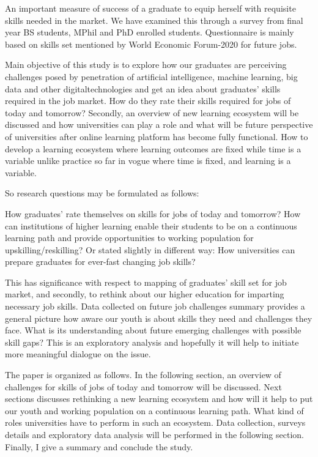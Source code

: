 \documentclass[
  12pt]{article}
\begin{document}
An important measure of success of a graduate to equip herself with
requisite skills needed in the market. We have examined this through a
survey from final year BS students, MPhil and PhD enrolled students.
Questionnaire is mainly based on skills set mentioned by World Economic
Forum-2020 for future jobs.

Main objective of this study is to explore how our graduates are
perceiving challenges posed by penetration of artificial intelligence,
machine learning, big data and other digitaltechnologies and get an idea
about graduates' skills required in the job market. How do they rate
their skills required for jobs of today and tomorrow? Secondly, an
overview of new learning ecosystem will be discussed and how
universities can play a role and what will be future perspective of
universities after online learning platform has become fully functional.
How to develop a learning ecosystem where learning outcomes are fixed
while time is a variable unlike practice so far in vogue where time is
fixed, and learning is a variable.

So research questions may be formulated as follows:

How graduates' rate themselves on skills for jobs of today and tomorrow?
How can institutions of higher learning enable their students to be on a
continuous learning path and provide opportunities to working population
for upskilling/reskilling? Or stated slightly in different way: How
universities can prepare graduates for ever-fast changing job skills?

This has significance with respect to mapping of graduates' skill set
for job market, and secondly, to rethink about our higher education for
imparting necessary job skills. Data collected on future job challenges
summary provides a general picture how aware our youth is about skills
they need and challenges they face. What is its understanding about
future emerging challenges with possible skill gaps? This is an
exploratory analysis and hopefully it will help to initiate more
meaningful dialogue on the issue.

The paper is organized as follows. In the following section, an overview
of challenges for skills of jobs of today and tomorrow will be
discussed. Next sections discusses rethinking a new learning ecosystem
and how will it help to put our youth and working population on a
continuous learning path. What kind of roles universities have to
perform in such an ecosystem. Data collection, surveys details and
exploratory data analysis will be performed in the following section.
Finally, I give a summary and conclude the study.
\end{document}
